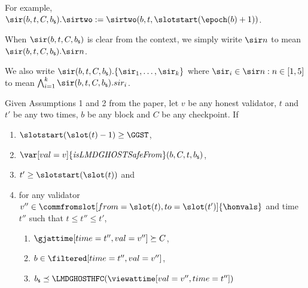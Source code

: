 \documentclass{article}
\begin{document}
\begin{definition}
    For example, $\sir(b,t,C,b_\mathsf{s}).\sirtwo := \sirtwo(b,t,\slotstart(\epoch(b)+1))$.

    When $\sir(b,t,C,b_\mathsf{s})$ is clear from the context, we simply wirite $\sir n$ to mean $\sir(b,t,C,b_\mathsf{s}).\sir n$.

    We also write $\sir(b,t,C,b_\mathsf{s}).\{\sir_1,\ldots,\sir_k\}$ where $\sir_i \in {\sir n: n \in [1,5]}$ to mean  $\bigwedge_{i=1}^k \sir(b,t,C,b_\mathsf{s}).sir_i$.
\end{definition}

\begin{lemma}\label{lem:ffg-condition-on-q-implies-safety}
    Given Assumptions 1 and 2 from the paper,
    let $v$ be any honest validator,
    $t$ and $t'$ be any two times,
    $b$ be any block and
    $C$ be any checkpoint.
    If
    \begin{enumerate}
        \item $\slotstart(\slot(t)-1)\geq\GGST$,
        \item $\var[val=v]{\mathit{isLMDGHOSTSafeFrom}}(b,C,t,b_\mathsf{s})$,
        \item $t' \geq \slotstart(\slot(t))$ and
        \item for any validator $v'' \in \commfromslot[from=\slot(t),to=\slot(t')]{\honvals}$ and time $t''$ such that $t \leq t'' \leq t'$, 
        \begin{enumerate}[label*=\arabic*.]
            \item $\gjattime[time=t'',val=v''] \succeq C$,
            \item $b \in \filtered[time=t'',val=v'']$,
            \item $b_\mathsf{s} \preceq  \LMDGHOSTHFC(\viewattime[val=v'',time=t''])$
        \end{enumerate}
    \end{enumerate}


\end{lemma}
\end{document}
